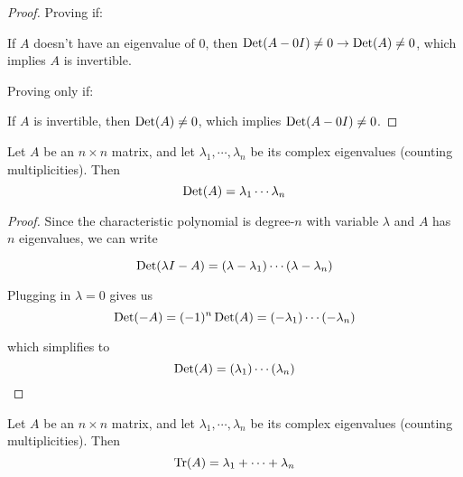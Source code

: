 \begin{proof}
Proving if: 

If $A$ doesn't have an eigenvalue of 0, then $\operatorname{Det}(A - 0I) \neq 0 \rightarrow \operatorname{Det}(A) \neq 0$, which implies $A$ is invertible. 

Proving only if: 

If $A$ is invertible, then $\operatorname{Det}(A) \neq 0$, which implies $\operatorname{Det}(A - 0I) \neq 0$. 
\end{proof}

\begin{theorem}
Let $A$ be an $n \times n$ matrix, and let $\lambda_{1}, \cdots, \lambda_{n}$ be its complex eigenvalues (counting multiplicities). Then
$$\operatorname{Det}(A) = \lambda_{1} \cdots \lambda_{n}$$
\end{theorem}


\begin{proof}
Since the characteristic polynomial is degree-$n$ with variable $\lambda$ and $A$ has $n$ eigenvalues, we can write 

$$\operatorname{Det}(\lambda I - A) = (\lambda - \lambda_{1}) \cdots (\lambda - \lambda_{n})$$

Plugging in $\lambda = 0$ gives us 
$$\operatorname{Det}(-A) = (-1)^{n} \operatorname{Det}(A) = (- \lambda_{1}) \cdots (- \lambda_{n})$$

which simplifies to 
$$\operatorname{Det}(A) = (\lambda_{1}) \cdots (\lambda_{n})$$
\end{proof}


\begin{theorem}
Let $A$ be an $n \times n$ matrix, and let $\lambda_{1}, \cdots, \lambda_{n}$ be its complex eigenvalues (counting multiplicities). Then
$$\Trace(A) = \lambda_{1} + \cdots + \lambda_{n}$$ 
\end{theorem}

